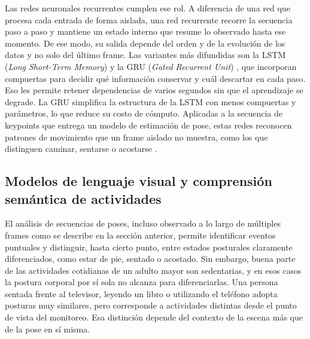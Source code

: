 Las redes neuronales recurrentes cumplen ese rol.
A diferencia de una red que procesa cada entrada de forma aislada, una red recurrente recorre la secuencia paso a paso y mantiene un estado interno que resume lo observado hasta ese momento.
De ese modo, su salida depende del orden y de la evolución de los datos y no solo del último frame.
Las variantes más difundidas son la LSTM (\textit{Long Short-Term Memory}) \parencite{Hochreiter1997} y la GRU (\textit{Gated Recurrent Unit}) \parencite{Cho2014}, que incorporan compuertas para decidir qué información conservar y cuál descartar en cada paso.
Eso les permite retener dependencias de varios segundos sin que el aprendizaje se degrade.
La GRU simplifica la estructura de la LSTM con menos compuertas y parámetros, lo que reduce su costo de cómputo.
Aplicadas a la secuencia de keypoints que entrega un modelo de estimación de pose, estas redes reconocen patrones de movimiento que un frame aislado no muestra, como los que distinguen caminar, sentarse o acostarse \parencite{Ramirez2022}.

\subsection{Modelos de lenguaje visual y comprensión semántica de actividades}
\label{sec:vlm_marco}

El análisis de secuencias de poses, incluso observado a lo largo de múltiples frames como se describe en la sección anterior, permite identificar eventos puntuales y distinguir, hasta cierto punto, entre estados posturales claramente diferenciados, como estar de pie, sentado o acostado.
Sin embargo, buena parte de las actividades cotidianas de un adulto mayor son sedentarias, y en esos casos la postura corporal por sí sola no alcanza para diferenciarlas.
Una persona sentada frente al televisor, leyendo un libro o utilizando el teléfono adopta posturas muy similares, pero corresponde a actividades distintas desde el punto de vista del monitoreo.
Esa distinción depende del contexto de la escena más que de la pose en sí misma.

